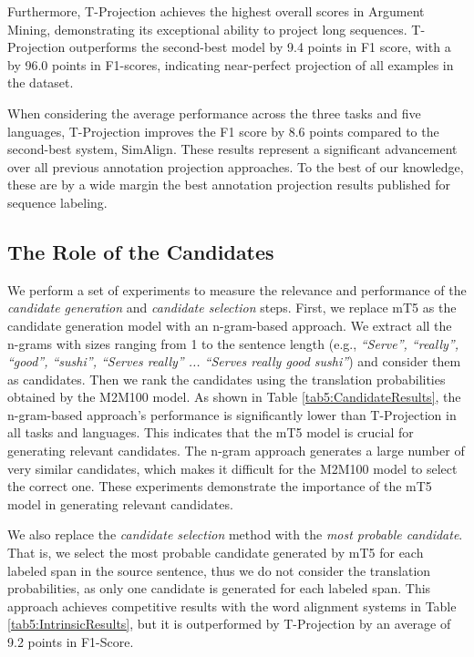 Furthermore, T-Projection achieves the highest overall scores in Argument Mining, demonstrating its exceptional ability to project long sequences. T-Projection outperforms the second-best model by 9.4 points in F1 score, with a by 96.0 points in F1-scores, indicating near-perfect projection of all examples in the dataset.

When considering the average performance across the three tasks and five languages, T-Projection improves the F1 score by 8.6 points compared to the second-best system, SimAlign. These results represent a significant advancement over all previous annotation projection approaches. To the best of our knowledge, these are by a wide margin the best annotation projection results published for sequence labeling.


\subsection{The Role of the Candidates} \label{sec5:RoleCandidates}



We perform a set of experiments to measure the relevance and performance of the \emph{candidate generation} and \emph{candidate selection} steps. First, we replace mT5 as the candidate generation model with an n-gram-based approach. We extract all the n-grams with sizes ranging from 1 to the sentence length (e.g., \textit{``Serve'', ``really'', ``good'', ``sushi'', ``Serves really'' ... ``Serves really good sushi''}) and consider them as candidates. Then we rank the candidates using the translation probabilities obtained by the M2M100 model. As shown in Table \ref{tab5:CandidateResults}, the n-gram-based approach's performance is significantly lower than T-Projection in all tasks and languages. This indicates that the mT5 model is crucial for generating relevant candidates. The n-gram approach generates a large number of very similar candidates, which makes it difficult for the M2M100 model to select the correct one. These experiments demonstrate the importance of the mT5 model in generating relevant candidates.

We also replace the \emph{candidate selection} method with the \emph{most probable candidate}. That is, we select the most probable candidate generated by mT5 for each labeled span in the source sentence, thus we do not consider the translation probabilities, as only one candidate is generated for each labeled span. This approach achieves competitive results with the word alignment systems in Table \ref{tab5:IntrinsicResults}, but it is outperformed by T-Projection by an average of 9.2 points in F1-Score.

